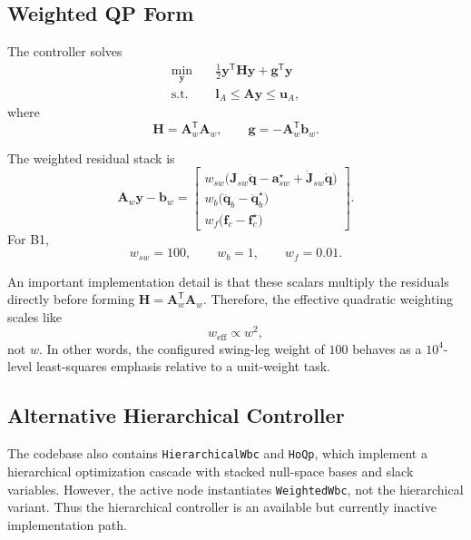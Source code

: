 \documentclass[11pt,a4paper]{article}
\newcommand{\vect}[1]{\bm{#1}}
\newcommand{\mat}[1]{\bm{#1}}
\newcommand{\trans}{^{\mathsf T}}
\newcommand{\code}[1]{\texttt{#1}}
\begin{document}
\subsection{Weighted QP Form}
The controller solves
\begin{align}
\min_{\vect{y}} \quad &
\frac{1}{2}\vect{y}\trans \mat{H}\vect{y} + \vect{g}\trans\vect{y} \\
\text{s.t.}\quad &
\vect{l}_A \le \mat{A}\vect{y} \le \vect{u}_A,
\end{align}
where
\begin{equation}
\mat{H} = \mat{A}_w\trans \mat{A}_w,\qquad
\vect{g} = -\mat{A}_w\trans \vect{b}_w.
\end{equation}

The weighted residual stack is
\begin{equation}
\mat{A}_w \vect{y} - \vect{b}_w =
\begin{bmatrix}
w_{sw}\big(\mat{J}_{sw}\ddot{\vect{q}} - \vect{a}_{sw}^{\star} + \dot{\mat{J}}_{sw}\dot{\vect{q}}\big) \\
w_{b}\big(\ddot{\vect{q}}_b - \ddot{\vect{q}}_b^\star\big) \\
w_{f}\big(\vect{f}_c - \vect{f}_c^\star\big)
\end{bmatrix}.
\end{equation}
For B1,
\begin{equation}
w_{sw} = 100,\qquad
w_b = 1,\qquad
w_f = 0.01.
\end{equation}

An important implementation detail is that these scalars multiply the residuals directly before forming \(\mat{H} = \mat{A}_w\trans\mat{A}_w\). Therefore, the effective quadratic weighting scales like
\begin{equation}
w_{\mathrm{eff}} \propto w^2,
\end{equation}
not \(w\). In other words, the configured swing-leg weight of \(100\) behaves as a \(10^4\)-level least-squares emphasis relative to a unit-weight task.

\subsection{Alternative Hierarchical Controller}
The codebase also contains \code{HierarchicalWbc} and \code{HoQp}, which implement a hierarchical optimization cascade with stacked null-space bases and slack variables. However, the active node instantiates \code{WeightedWbc}, not the hierarchical variant. Thus the hierarchical controller is an available but currently inactive implementation path.
\end{document}
